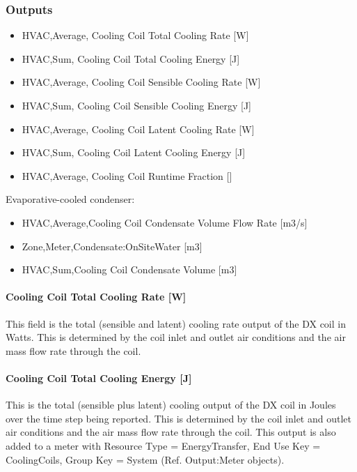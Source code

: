 \subsubsection{Outputs}\label{outputs-5-003}

\begin{itemize}
\item
  HVAC,Average, Cooling Coil Total Cooling Rate {[}W{]}
\item
  HVAC,Sum, Cooling Coil Total Cooling Energy {[}J{]}
\item
  HVAC,Average, Cooling Coil Sensible Cooling Rate {[}W{]}
\item
  HVAC,Sum, Cooling Coil Sensible Cooling Energy {[}J{]}
\item
  HVAC,Average, Cooling Coil Latent Cooling Rate {[}W{]}
\item
  HVAC,Sum, Cooling Coil Latent Cooling Energy {[}J{]}
\item
  HVAC,Average, Cooling Coil Runtime Fraction {[]}
\end{itemize}

Evaporative-cooled condenser:

\begin{itemize}
\item
  HVAC,Average,Cooling Coil Condensate Volume Flow Rate {[}m3/s{]}
\item
  Zone,Meter,Condensate:OnSiteWater {[}m3{]}
\item
  HVAC,Sum,Cooling Coil Condensate Volume {[}m3{]}
\end{itemize}

\paragraph{Cooling Coil Total Cooling Rate {[}W{]}}\label{cooling-coil-total-cooling-rate-w-1}

This field is the total (sensible and latent) cooling rate output of the DX coil in Watts. This is determined by the coil inlet and outlet air conditions and the air mass flow rate through the coil.

\paragraph{Cooling Coil Total Cooling Energy {[}J{]}}\label{cooling-coil-total-cooling-energy-j-1}

This is the total (sensible plus latent) cooling output of the DX coil in Joules over the time step being reported. This is determined by the coil inlet and outlet air conditions and the air mass flow rate through the coil. This output is also added to a meter with Resource Type = EnergyTransfer, End Use Key = CoolingCoils, Group Key = System (Ref. Output:Meter objects).

